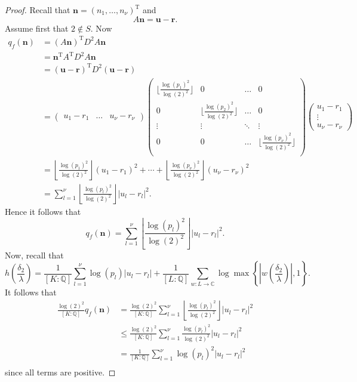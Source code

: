 \begin{proof}
Recall that $\mathbf{n} = (n_1, \dots, n_{\nu})^{\text{T}}$ and 
\[A\mathbf{n} = \mathbf{u} - \mathbf{r}.\]
Assume first that $2 \notin S$. Now
\begin{align*}
q_f(\mathbf{n})	
	& = (A\mathbf{n})^{\text{T}}D^2A\mathbf{n}\\
	& = \mathbf{n}^{\text{T}}A^{\text{T}}D^2A\mathbf{n}\\
	& = (\mathbf{u} - \mathbf{r})^{\text{T}}D^2(\mathbf{u} - \mathbf{r})\\
	& = \begin{pmatrix} u_1 - r_1&  \dots & u_{\nu} - r_{\nu} \end{pmatrix} 
		\begin{pmatrix} \lfloor\frac{\log(p_1)^2}{\log(2)^2}\rfloor& 0 & \dots & 0\\ 0 &\lfloor\frac{\log(p_2)^2}{\log(2)^2}\rfloor & \dots & 0\\
		\vdots & \vdots & \ddots & \vdots\\ 0 & 0 & \dots & \lfloor\frac{\log(p_{\nu})^2}{\log(2)^2}\rfloor\\ 
		\end{pmatrix} 
		\begin{pmatrix} u_1 - r_1 \\  \vdots \\ u_{\nu} - r_{\nu} \end{pmatrix} \\
	& =\left\lfloor\frac{\log(p_1)^2}{\log(2)^2}\right\rfloor(u_1-r_1)^2 + \cdots + \left\lfloor\frac{\log(p_{\nu})^2}{\log(2)^2}\right\rfloor(u_{\nu}-r_{\nu})^2\\
	& = \sum_{l = 1}^{\nu}\left\lfloor\frac{\log(p_l)^2}{\log(2)^2}\right\rfloor|u_l-r_l|^2.
\end{align*}
Hence it follows that
\[ q_f(\mathbf{n}) = \sum_{l = 1}^{\nu}\left\lfloor\frac{\log(p_l)^2}{\log(2)^2}\right\rfloor|u_l-r_l|^2.\]
Now, recall that
\[h\left(\frac{\delta_2}{\lambda}\right) = \frac{1}{[K:\mathbb{Q}]}\sum_{l = 1}^{\nu} \log(p_l)|u_l - r_l| + \frac{1}{[L:\mathbb{Q}]}\sum_{w :L \to \mathbb{C}} \log \max \left\{ \left|w\left(\frac{\delta_2}{\lambda}\right)\right|, 1\right\}.\]
It follows that
\begin{align*}
\frac{\log(2)^2}{[K:\mathbb{Q}]}q_f(\mathbf{n}) 
	& = \frac{\log(2)^2}{[K:\mathbb{Q}]}\sum_{l = 1}^{\nu} \left\lfloor\frac{\log(p_l)^2}{\log(2)^2}\right\rfloor|u_l -r_l|^2 \\
	& \leq \frac{\log(2)^2}{[K:\mathbb{Q}]}\sum_{l = 1}^{\nu}\frac{\log(p_l)^2}{\log(2)^2}|u_l -r_l|^2 \\
	& = \frac{1}{[K:\mathbb{Q}]}\sum_{l = 1}^{\nu}\log(p_l)^2|u_l -r_l|^2 \\
\end{align*}
since all terms are positive. 


\end{proof}
